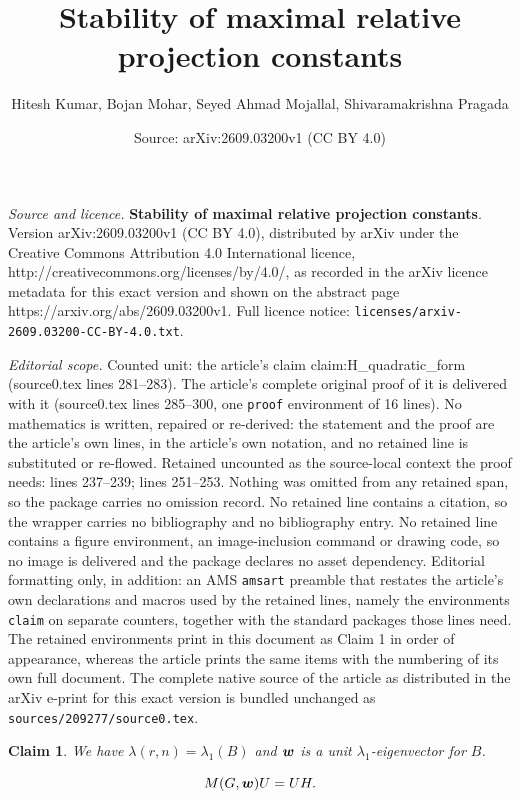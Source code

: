 \documentclass[10pt,a4paper]{amsart}
\title{\textbf{Stability of maximal relative projection constants}}
\author{Hitesh Kumar, Bojan Mohar, Seyed Ahmad Mojallal, Shivaramakrishna Pragada}
\date{Source: arXiv:2609.03200v1 (CC BY 4.0)}
\newtheorem{claim}{Claim}
\def\w{\mbox{\boldmath $w$}}
\begin{document}
\maketitle

\noindent\emph{Source and licence.} \textbf{Stability of maximal relative projection constants}. Version arXiv:2609.03200v1 (CC BY 4.0), distributed by arXiv under the Creative Commons Attribution 4.0 International licence, http://creativecommons.org/licenses/by/4.0/, as recorded in the arXiv licence metadata for this exact version and shown on the abstract page https://arxiv.org/abs/2609.03200v1. Full licence notice: \texttt{licenses/arxiv-2609.03200-CC-BY-4.0.txt}.\par\smallskip

\noindent\textit{Editorial scope.} Counted unit: the article's claim claim:H\_quadratic\_form (source0.tex lines 281--283). The article's complete original proof of it is delivered with it (source0.tex lines 285--300, one \texttt{proof} environment of 16 lines). No mathematics is written, repaired or re-derived: the statement and the proof are the article's own lines, in the article's own notation, and no retained line is substituted or re-flowed.  Retained uncounted as the source-local context the proof needs: lines 237--239; lines 251--253.  Nothing was omitted from any retained span, so the package carries no omission record.  No retained line contains a citation, so the wrapper carries no bibliography and no bibliography entry.  No retained line contains a figure environment, an image-inclusion command or drawing code, so no image is delivered and the package declares no asset dependency.  Editorial formatting only, in addition: an AMS \texttt{amsart} preamble that restates the article's own declarations and macros used by the retained lines, namely the environments \texttt{claim} on separate counters, together with the standard packages those lines need.  The retained environments print in this document as Claim 1 in order of appearance, whereas the article prints the same items with the numbering of its own full document.  The complete native source of the article as distributed in the arXiv e-print for this exact version is bundled unchanged as \texttt{sources/209277/source0.tex}.
\begin{claim}\label{claim:spectral_radius_B}
We have $\lambda(r,n) = \lambda_1(B)$ and $\w$ is a unit $\lambda_1$-eigenvector for $B$. 
\end{claim}

\begin{equation}\label{eq:H_equation}
    M(G, \w) U = UH.
\end{equation}
\end{document}
